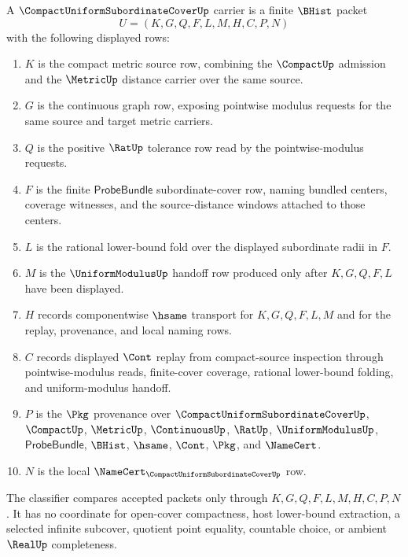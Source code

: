 \begin{definition}
\label{def:compact-uniform-subordinate-cover-namecert-surface}
A $\CompactUniformSubordinateCoverUp$ carrier is a finite $\BHist$ packet
$$
U=(K,G,Q,F,L,M,H,C,P,N)
$$
with the following displayed rows:
\begin{enumerate}
\item $K$ is the compact metric source row, combining the $\CompactUp$ admission and the $\MetricUp$ distance carrier over the same source.
\item $G$ is the continuous graph row, exposing pointwise modulus requests for the same source and target metric carriers.
\item $Q$ is the positive $\RatUp$ tolerance row read by the pointwise-modulus requests.
\item $F$ is the finite $\mathsf{ProbeBundle}$ subordinate-cover row, naming bundled centers, coverage witnesses, and the source-distance windows attached to those centers.
\item $L$ is the rational lower-bound fold over the displayed subordinate radii in $F$.
\item $M$ is the $\UniformModulusUp$ handoff row produced only after $K,G,Q,F,L$ have been displayed.
\item $H$ records componentwise $\hsame$ transport for $K,G,Q,F,L,M$ and for the replay, provenance, and local naming rows.
\item $C$ records displayed $\Cont$ replay from compact-source inspection through pointwise-modulus reads, finite-cover coverage, rational lower-bound folding, and uniform-modulus handoff.
\item $P$ is the $\Pkg$ provenance over $\CompactUniformSubordinateCoverUp$, $\CompactUp$, $\MetricUp$, $\ContinuousUp$, $\RatUp$, $\UniformModulusUp$, $\mathsf{ProbeBundle}$, $\BHist$, $\hsame$, $\Cont$, $\Pkg$, and $\NameCert$.
\item $N$ is the local $\NameCert_{\CompactUniformSubordinateCoverUp}$ row.
\end{enumerate}
The classifier compares accepted packets only through $K,G,Q,F,L,M,H,C,P,N$. It has no coordinate for open-cover compactness, host lower-bound extraction, a selected infinite subcover, quotient point equality, countable choice, or ambient $\RealUp$ completeness.
\end{definition}

